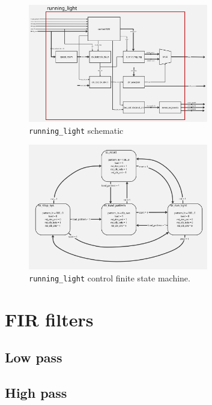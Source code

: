\documentclass[12pt]{article}   	%
\begin{document}
\begin{figure}[htbp]
\begin{center}
\includegraphics[width=0.7\textwidth]{img/running_light_sch}
\caption{\lstinline{running_light} schematic}
\label{fig:running_light_sch}
\end{center}
\end{figure}

\begin{figure}[htbp]
\begin{center}
\includegraphics[width=0.7\textwidth]{img/running_light_fsm}
\caption{\lstinline{running_light} control finite state machine.}
\label{fig:running_light_fsm}
\end{center}
\end{figure}


\section{FIR filters}


\subsection{Low pass}



\subsection{High pass}
\end{document}
